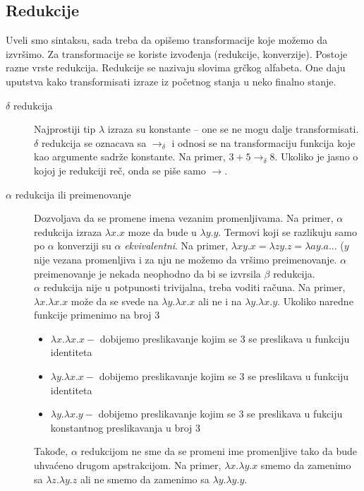 \documentclass[../main.tex]{subfiles}
\begin{document}
\subsection{Redukcije}								%

Uveli smo sintaksu, sada treba da opišemo transformacije koje možemo da izvršimo. Za transformacije se koriste izvođenja (redukcije, konverzije). Postoje razne vrste redukcija. Redukcije se nazivaju slovima grčkog alfabeta. One daju uputstva kako transformisati izraze iz početnog stanja u neko finalno stanje.

\begin{description}
\item[$\delta$ redukcija] \hfill

Najprostiji tip $\lambda$ izraza su konstante -- one se ne mogu dalje transformisati. $\delta$ redukcija se oznacava sa $\rightarrow_{\delta}$ i odnosi se na transformaciju funkcija koje kao argumente sadrže konstante. Na primer, $3 + 5 \rightarrow_{\delta} 8$. Ukoliko je jasno o kojoj je redukciji reč, onda se piše samo $\rightarrow$.

\item[$\alpha$ redukcija ili preimenovanje] \hfill

Dozvoljava da se promene imena vezanim promenljivama. Na primer, $\alpha$ redukcija izraza $\lambda x.x$ moze da bude u $\lambda y.y$. Termovi koji se razlikuju samo po $\alpha$  konverziji su $\alpha$ {\it ekvivalentni}. Na primer, $\lambda xy.x = \lambda zy.z = \lambda ay.a ...$ ($y$ nije vezana promenljiva i za nju ne možemo da vršimo preimenovanje. $\alpha$ preimenovanje je nekada neophodno da bi se izvrsila $\beta$ redukcija. 
\\
$\alpha$ redukcija nije u potpunosti trivijalna, treba voditi računa. Na primer, $\lambda x.\lambda x.x$ može da se svede na $\lambda y.\lambda x.x$ ali ne i na $\lambda y.\lambda x.y$. Ukoliko naredne funkcije primenimo na broj 3
\begin{itemize}
\item[] $\lambda x.\lambda x.x - $ dobijemo preslikavanje kojim se  3 se preslikava u funkciju identiteta 
\item[] $\lambda y.\lambda x.x - $ dobijemo preslikavanje kojim se 3 se preslikava u funkciju identiteta 
\item[] $\lambda y.\lambda x.y - $ dobijemo preslikavanje kojim se 3 se preslikava u fukciju konstantnog preslikavanja u broj 3
\end{itemize}
Takođe, $\alpha$ redukcijom ne sme da se promeni ime promenljive tako da bude uhvaćeno drugom apstrakcijom. Na primer, $\lambda x.\lambda y.x$ smemo da zamenimo sa $\lambda z.\lambda y.z$ ali ne smemo da zamenimo sa $\lambda y.\lambda y.y$.


\end{description}
\end{document}

